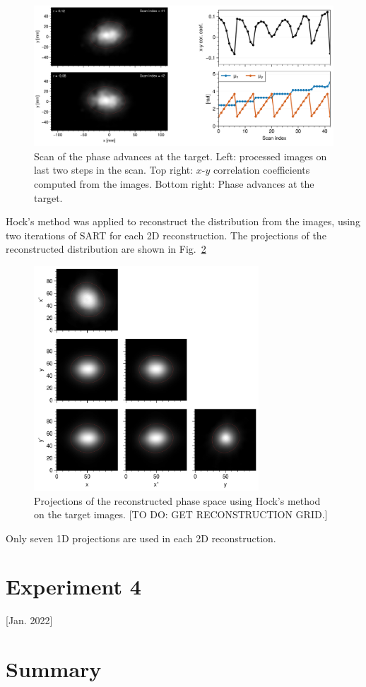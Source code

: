 \begin{figure}[!p]
    \centering
    \includegraphics[width=\textwidth]{Images/chapter5/exp3/target_scan/target_scan.png}
    \caption{Scan of the phase advances at the target. Left: processed images on last two steps in the scan. Top right: $x$-$y$ correlation coefficients computed from the images. Bottom right: Phase advances at the target.}
    \label{fig:exp3_target_scan}
\end{figure}
%

Hock's method was applied to reconstruct the distribution from the images, using two iterations of SART for each 2D reconstruction. The projections of the reconstructed distribution are shown in Fig.~\ref{fig:exp3_rec_corner_Hock}
%
\begin{figure}[!p]
    \centering
    \includegraphics[width=0.75\textwidth]{Images/chapter5/exp3/target_scan/rec_corner_Hock.png}
    \caption{Projections of the reconstructed phase space using Hock's method on the target images. [TO DO: GET RECONSTRUCTION GRID.]}
    \label{fig:exp3_rec_corner_Hock}
\end{figure}
%
Only seven 1D projections are used in each 2D reconstruction. 





\section{Experiment 4}

[Jan. 2022]


\section{Summary}